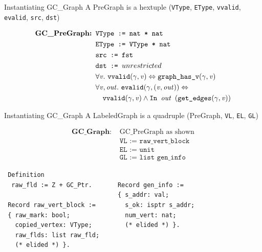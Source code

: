 \documentclass[usenames, xcolor=dvipsnames]{beamer}
\newcommand{\m}[1]{\ensuremath{\mathit{#1}}} %
\newcommand{\bi}{\Leftrightarrow} %
\begin{document}
\begin{frame}{Instantiating GC\_Graph}
A PreGraph is a hextuple (\texttt{VType}, \texttt{EType}, \texttt{vvalid}, \texttt{evalid}, \texttt{src}, \texttt{dst})
\begin{flushleft}
\begin{equation*}
\begin{split}
\textbf{GC\_PreGraph: } &\texttt{VType := nat * nat} \\
                    &\texttt{EType := VType * nat} \\
                    &\texttt{src := fst} \\
                    &\texttt{dst := } unrestricted \\ 
                    &\forall \m{v}.~\texttt{vvalid}(\gamma, \m{v}) \bi \texttt{graph\_has\_v}(\gamma, \m{v}) \\
                    &\forall \m{v,out}.~\texttt{evalid}(\gamma, \m{(v,out)}) \bi \\
                    &\quad \texttt{vvalid}(\gamma, \m{v}) \wedge \texttt{In } \m{out} \hspace{0.5em} (\texttt{get\_edges}(\gamma, \m{v}))
\end{split}
\end{equation*}
\end{flushleft}
\end{frame}

\begin{frame}[fragile]{Instantiating GC\_Graph}
A LabeledGraph is a quadruple (PreGraph, \texttt{VL}, \texttt{EL}, \texttt{GL})
\vspace{-1.5em}
\begin{flushleft}
\begin{equation*}
\begin{split}
\textbf{GC\_Graph: } &\text{GC\_PreGraph as shown} \\
                  &\texttt{VL := raw\_vert\_block} \\
                  &\texttt{EL := unit} \\
                  &\texttt{GL := list gen\_info} 
\end{split}
\end{equation*}
\end{flushleft}
\pause
\begin{Verbatim}
 Definition 
  raw_fld := Z + GC_Ptr.       Record gen_info :=
                               { s_addr: val;
 Record raw_vert_block :=        s_ok: isptr s_addr;
 { raw_mark: bool;               num_vert: nat;
   copied_vertex: VType;         (* elided *) }.
   raw_flds: list raw_fld;     
   (* elided *) }.             
\end{Verbatim}
\end{frame}
\end{document}
